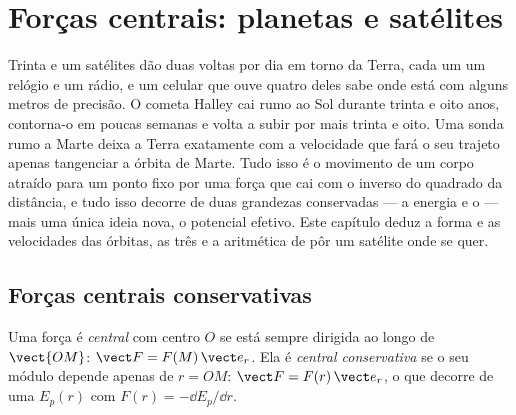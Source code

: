 \chapter{Forças centrais: planetas e satélites}\label{ch:b1:central-forces}

Trinta e um satélites dão duas voltas por dia em torno da Terra, cada um um relógio
e um rádio, e um celular que ouve quatro deles sabe onde está com
alguns metros de precisão. O cometa Halley cai rumo ao Sol durante trinta e oito
anos, contorna-o em poucas semanas e volta a subir por mais
trinta e oito. Uma sonda rumo a Marte deixa a Terra exatamente com a
velocidade que fará o seu trajeto apenas tangenciar a órbita de Marte. Tudo isso
é o movimento de um corpo atraído para um ponto fixo por uma força que
cai com o inverso do quadrado da distância, e tudo isso decorre
de duas grandezas conservadas --- a energia e o  --- mais
uma única ideia nova, o potencial efetivo. Este capítulo deduz a
forma e as velocidades das órbitas, as três  e a aritmética de
pôr um satélite onde se quer.

\section{Forças centrais conservativas}

\begin{definition}\label{def:b1:central-forces:central}
Uma força é \emph{central} com centro $O$ se está sempre dirigida
ao longo de $\vect{OM}$: $\vect F = F(M)\,\vect e_r$. Ela é \emph{central
conservativa} se o seu módulo depende apenas de $r = OM$: $\vect F =
F(r)\,\vect e_r$, o que decorre de uma  $E_p(r)$ com
$F(r) = -\dd E_p/\dd r$.
\end{definition}

